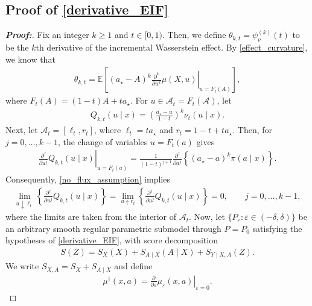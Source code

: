 \documentclass[11pt,twoside]{article}
\theoremstyle{definition}
\theoremstyle{remark}
\begin{document}
\subsection{Proof of \cref{derivative_EIF}} \label{derivative_EIF_proof}

\begin{proof}[\textbf{Proof:}]

Fix an integer $k\geq1$ and $t\in [0,1)$. Then, we define $\theta_{k,t} = \psi_\nu^{(k)}(t)$ to be the $k$th derivative of the incremental Wasserstein effect. By \cref{effect_curvature}, we know that
\begin{align}
    \theta_{k,t} = \mathbb{E}\left[ (a_\star-A)^k \left. \frac{\partial^k}{\partial u^k}\mu(X,u) \right|_{u=F_t(A)} \right],
    \label{wasserstein_kth_derivative_representation}
\end{align}
where $F_t(A) = (1 - t)A + t a_\star$. For $u\in\mathcal{A}_t=F_t(\mathcal{A})$, let
\begin{align*}
    Q_{k,t}(u\mid x) = \left( \frac{a_\star-u}{1-t} \right)^k \nu_t(u\mid x).
\end{align*}
Next, let $\mathcal{A}_t=[\ell_t,r_t]$, where $\ell_t=ta_\star$ and $r_t=1-t+ta_\star$. Then, for $j=0,\ldots,k-1$, the change of variables $u=F_t(a)$ gives
\begin{align*}
    \left.\frac{\partial^j}{\partial u^j} Q_{k,t}(u\mid x)\right|_{u=F_t(a)} =\frac{1}{(1-t)^{j+1}} \frac{\partial^j}{\partial a^j}\left\{(a_\star-a)^k\pi(a\mid x)\right\}.
\end{align*}
Consequently, \cref{no_flux_assumption} implies
\begin{align} \label{zero_flux_assumption}
    \lim_{u\downarrow\ell_t} \left\{ \frac{\partial^j}{\partial u^j}Q_{k,t}(u\mid x) \right\} =\lim_{u\uparrow r_t} \left\{  \frac{\partial^j}{\partial u^j} Q_{k,t}(u\mid x) \right\} = 0, \qquad j=0,\ldots,k-1,
\end{align}
where the limits are taken from the interior of $\mathcal{A}_t$. Now, let $\{P_\varepsilon:\varepsilon\in(-\delta,\delta)\}$ be an arbitrary smooth regular parametric submodel through $P=P_0$ satisfying the hypotheses of \cref{derivative_EIF}, with score decomposition
\begin{align*}
    S(Z) = S_X(X) + S_{A\mid X}(A\mid X) + S_{Y\mid X,A}(Z).
\end{align*}
We write $S_{X,A}=S_X+S_{A\mid X}$ and define
\begin{align*}
    \mu^\dagger(x,a) = \left. \frac{\partial}{\partial\varepsilon} \mu_\varepsilon(x,a) \right|_{\varepsilon=0}.

\end{align*}
\end{proof}
\end{document}
